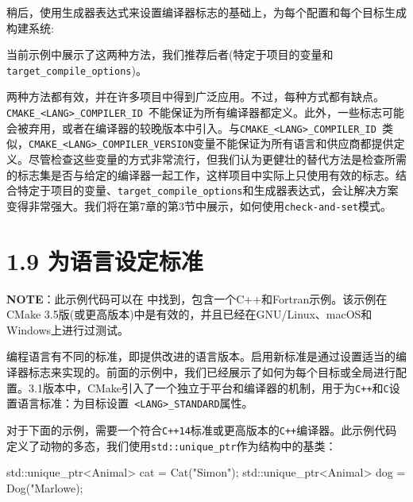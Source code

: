 稍后，使用生成器表达式来设置编译器标志的基础上，为每个配置和每个目标生成构建系统:


当前示例中展示了这两种方法，我们推荐后者(特定于项目的变量和\texttt{target\_compile\_options})。

两种方法都有效，并在许多项目中得到广泛应用。不过，每种方式都有缺点。\texttt{CMAKE\_<LANG>\_COMPILER\_ID }不能保证为所有编译器都定义。此外，一些标志可能会被弃用，或者在编译器的较晚版本中引入。与\texttt{CMAKE\_<LANG>\_COMPILER\_ID }类似，\texttt{CMAKE\_<LANG>\_COMPILER\_VERSION}变量不能保证为所有语言和供应商都提供定义。尽管检查这些变量的方式非常流行，但我们认为更健壮的替代方法是检查所需的标志集是否与给定的编译器一起工作，这样项目中实际上只使用有效的标志。结合特定于项目的变量、\texttt{target\_compile\_options}和生成器表达式，会让解决方案变得非常强大。我们将在第7章的第3节中展示，如何使用\texttt{check-and-set}模式。


\section{1.9 为语言设定标准}

\begin{myInfoBox}
\textbf{NOTE}：此示例代码可以在  中找到，包含一个C++和Fortran示例。该示例在CMake 3.5版(或更高版本)中是有效的，并且已经在GNU/Linux、macOS和Windows上进行过测试。
\end{myInfoBox}

编程语言有不同的标准，即提供改进的语言版本。启用新标准是通过设置适当的编译器标志来实现的。前面的示例中，我们已经展示了如何为每个目标或全局进行配置。3.1版本中，CMake引入了一个独立于平台和编译器的机制，用于为\texttt{C++}和\texttt{C}设置语言标准：为目标设置\texttt{ <LANG>\_STANDARD}属性。


对于下面的示例，需要一个符合\texttt{C++14}标准或更高版本的\texttt{C++}编译器。此示例代码定义了动物的多态，我们使用\texttt{std::unique\_ptr}作为结构中的基类：

\begin{codebox}[cpp]
std::unique_ptr<Animal> cat = Cat("Simon");
std::unique_ptr<Animal> dog = Dog("Marlowe);
\end{codebox}

